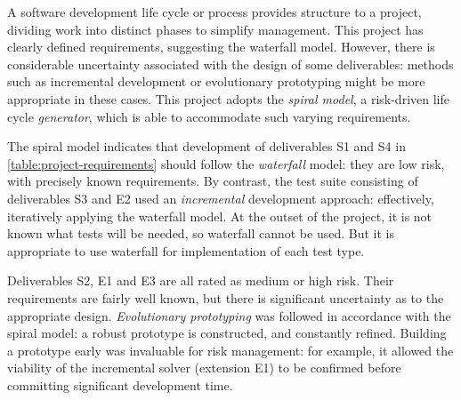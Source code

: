 


A software development life cycle or process provides structure to a project, dividing work into distinct phases to simplify management. This project has clearly defined requirements, suggesting the waterfall model. However, there is considerable uncertainty associated with the design of some deliverables: methods such as incremental development or evolutionary prototyping might be more appropriate in these cases. This project adopts the \emph{spiral model}, a risk-driven life cycle \emph{generator}, which is able to accommodate such varying requirements.

The spiral model indicates that development of deliverables S1 and S4 in \cref{table:project-requirements} should follow the \emph{waterfall} model: they are low risk, with precisely known requirements. By contrast, the test suite consisting of deliverables S3 and E2 used an \emph{incremental} development approach: effectively, iteratively applying the waterfall model. At the outset of the project, it is not known what tests will be needed\footnotemark, so waterfall cannot be used. But it is appropriate to use waterfall for implementation of each test type.

Deliverables S2, E1 and E3 are all rated as medium or high risk. Their requirements are fairly well known, but there is significant uncertainty as to the appropriate design. \emph{Evolutionary prototyping} was followed in accordance with the spiral model: a robust prototype is constructed, and constantly refined\footnotemark. Building a prototype early was invaluable for risk management: for example, it allowed the viability of the incremental solver (extension E1) to be confirmed before committing significant development time.

